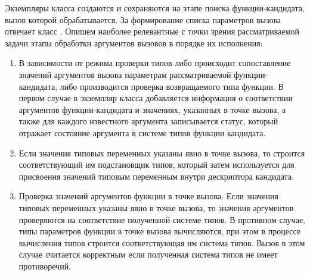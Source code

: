 Экземпляры класса  создаются и сохраняются на этапе поиска функции-кандидата, вызов которой обрабатывается. За формирование списка параметров вызова отвечает класс . Опишем наиболее релевантные с точки зрения рассматриваемой задачи этапы обработки аргументов вызовов в порядке их исполнения:
\begin{enumerate}
    \item В зависимости от режима проверки типов либо происходит сопоставление значений аргументов вызова параметрам рассматриваемой функции-кандидата, либо производится проверка возвращаемого типа функции. В первом случае в экземпляр класса  добавляется информация о соответствии аргументов функции-кандидата и значениях, указанных в точке вызова, а также для каждого известного аргумента записывается статус, который отражает состояние аргумента в системе типов функции кандидата.  
    \item Если значения типовых переменных указаны явно в точке вызова, то строится соответствующий им подстановщик типов, который затем используется для присвоения значений типовым переменным внутри дескриптора кандидата.
    \item Проверка значений аргументов функции в точке вызова. Если значения типовых переменных указаны явно в точке вызова, то значения аргументов проверяются на соответствие полученной системе типов. В противном случае, типы параметров функции в точке вызова вычисляются, при этом в процессе вычисления типов строится соответствующая им система типов. Вызов в этом случае считается корректным если полученная система типов не имеет противоречий.      
\end{enumerate}

